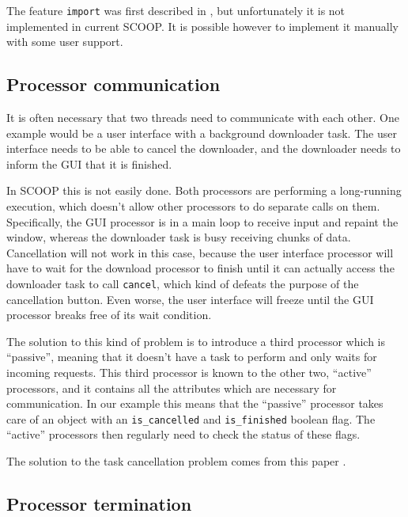 \documentclass[a4paper,10pt]{article}
\begin{document}
The feature \lstinline!import! was first described in \cite[p. 106]{Nienaltowski07}, but unfortunately it is not implemented in current SCOOP.
It is possible however to implement it manually with some user support.

\subsection{Processor communication}
\label{sec:processor-communication}

It is often necessary that two threads need to communicate with each other.
One example would be a user interface with a background downloader task.
The user interface needs to be able to cancel the downloader, and the downloader needs to inform the GUI that it is finished.

In SCOOP this is not easily done.
Both processors are performing a long-running execution, which doesn't allow other processors to do separate calls on them.
Specifically, the GUI processor is in a main loop to receive input and repaint the window, whereas the downloader task is busy receiving chunks of data.
Cancellation will not work in this case, because the user interface processor will have to wait for the download processor to finish until it can actually access the downloader task to call \lstinline!cancel!, 
which kind of defeats the purpose of the cancellation button.
Even worse, the user interface will freeze until the GUI processor breaks free of its wait condition.

The solution to this kind of problem is to introduce a third processor which is ``passive'', meaning that it doesn't have a task to perform and only waits for incoming requests.
This third processor is known to the other two, ``active'' processors, and it contains all the attributes which are necessary for communication.
In our example this means that the ``passive'' processor takes care of an object with an \lstinline!is_cancelled! and \lstinline!is_finished! boolean flag.
The ``active'' processors then regularly need to check the status of these flags.

The solution to the task cancellation problem comes from this paper \cite{paper:task-cancellation}.

\subsection{Processor termination}
\label{sec:processor-termination}
\end{document}
